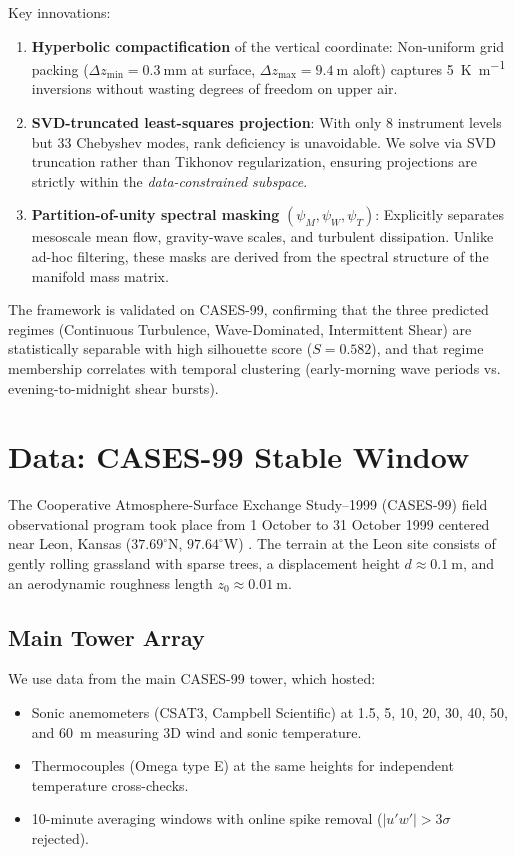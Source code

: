 \documentclass[11pt,a4paper]{article}
\begin{document}
Key innovations:
\begin{enumerate}
  \item \textbf{Hyperbolic compactification} of the vertical coordinate: Non-uniform grid packing ($\Delta z_{\min} = \SI{0.3}{\milli\meter}$ at surface, $\Delta z_{\max} = \SI{9.4}{\meter}$ aloft) captures \SI{5}{\kelvin\per\meter} inversions without wasting degrees of freedom on upper air.
  \item \textbf{SVD-truncated least-squares projection}: With only 8 instrument levels but 33 Chebyshev modes, rank deficiency is unavoidable. We solve via SVD truncation rather than Tikhonov regularization, ensuring projections are strictly within the \emph{data-constrained subspace}.
  \item \textbf{Partition-of-unity spectral masking} $(\psi_M, \psi_W, \psi_T)$: Explicitly separates mesoscale mean flow, gravity-wave scales, and turbulent dissipation. Unlike ad-hoc filtering, these masks are derived from the spectral structure of the manifold mass matrix.
\end{enumerate}

The framework is validated on CASES-99, confirming that the three predicted regimes (Continuous Turbulence, Wave-Dominated, Intermittent Shear) are statistically separable with high silhouette score ($S = 0.582$), and that regime membership correlates with temporal clustering (early-morning wave periods vs. evening-to-midnight shear bursts).

\section{Data: CASES-99 Stable Window}
\label{sec:data}

The Cooperative Atmosphere-Surface Exchange Study--1999 (CASES-99) field observational program took place from 1 October to 31 October 1999 centered near Leon, Kansas ($37.69^\circ\text{N}$, $97.64^\circ\text{W}$) \citep{Poulos2002}. The terrain at the Leon site consists of gently rolling grassland with sparse trees, a displacement height $d \approx \SI{0.1}{\meter}$, and an aerodynamic roughness length $z_0 \approx \SI{0.01}{\meter}$.

\subsection{Main Tower Array}

We use data from the main CASES-99 tower, which hosted:
\begin{itemize}
  \item Sonic anemometers (CSAT3, Campbell Scientific) at 1.5, 5, 10, 20, 30, 40, 50, and \SI{60}{\meter} measuring 3D wind and sonic temperature.
  \item Thermocouples (Omega type E) at the same heights for independent temperature cross-checks.
  \item 10-minute averaging windows with online spike removal ($|u'w'| > 3 \sigma$ rejected).
\end{itemize}
\end{document}
